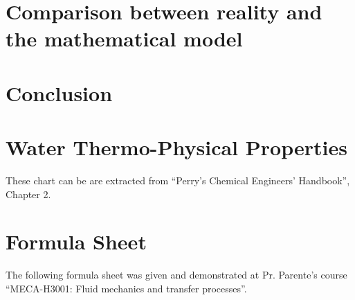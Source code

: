 \documentclass{report}
\begin{document}
	\chapter[Reality and mathematical model]{Comparison between reality and the mathematical model}\label{rvmm}
	
	\chapter{Conclusion}\label{ccl}
	
	
	\appendix
	
	\chapter{Water Thermo-Physical Properties}\label{WTPP}
	
	These chart can be are extracted from ``Perry’s	Chemical Engineers’ Handbook'', Chapter 2\cite{properties}.
	
	
	
	\chapter{Formula Sheet}\label{FORMU}
	
	The following formula sheet was given and demonstrated at Pr. Parente's course ``MECA-H3001: Fluid mechanics and transfer processes''.
	
	
	
	
	{}
	
	
\end{document}
